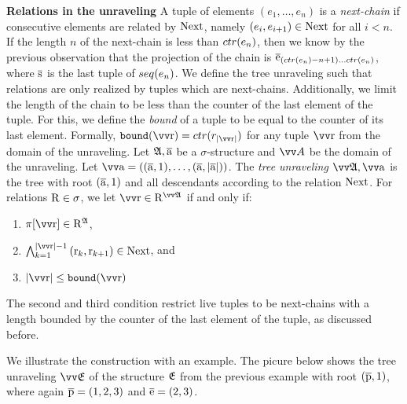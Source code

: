 \noindent
\textbf{Relations in the unraveling}
A tuple of elements $(e_{1}, \ldots, e_{n})$ is a \emph{next-chain} if consecutive elements are related by $\mathrm{Next}$, namely $(e_{i}, e_{i+1}) \in \mathrm{Next}$ for all $i < n$.
If the length $n$ of the next-chain is less than $\ctr{e_{n}}$, then we know by the previous observation that the projection of the chain is $\elemtuplee_{(\ctr{e_{n}}-n+1)\ldots{}\ctr{e_{n}}}$, where $\overline{\mathrm{s}}$ is the last tuple of $\seq{e_{n}}$.
We define the tree unraveling such that relations are only realized by tuples which are next-chains.
Additionally, we limit the length of the chain to be less than the counter of the last element of the tuple.
For this, we define the \emph{bound} of a tuple to be equal to the counter of its last element.
Formally, $\mathtt{bound}(\elemtuptupler) = \ctr{r_{|\elemtuptupler|}}$ for any tuple $\elemtuptupler$ from the domain of the unraveling.
Let ${\mathfrak{A}}, \overline{\mathrm{a}}$ be a $\sigma$-structure and $\unraveldom{A}$ be the domain of the unraveling.
Let $\elemtuptuplea = ((\elemtuplea, 1), \ldots, (\elemtuplea, |\elemtuplea|))$.
The \emph{tree unraveling} $\unravel{A}, \elemtuptuplea$ is the tree with root $(\overline{\mathrm{a}}, 1)$ and all descendants according to the relation $\mathrm{Next}$.
For relations $\mathrm{R} \in \sigma$, we let $\elemtuptupler \in \relR^{\unravel{A}}$ if and only if:\begin{enumerate}
  \item $\pi[\elemtuptupler] \in \relR^{\str{A}}$,
  \item $\bigwedge_{k=1}^{|\elemtuptupler|-1}{(\elemr_{k},\elemr_{k+1}) \in \relNext}$, and
  \item $|\elemtuptupler| \le \mathtt{bound}(\elemtuptupler)$
\end{enumerate}
The second and third condition restrict live tuples to be next-chains with a length bounded by the counter of the last element of the tuple, as discussed before.

We illustrate the construction with an example.
The picure below shows the tree unraveling $\unravel{E}$ of the structure ${\mathfrak{E}}$ from the previous example with root $(\overline{\mathrm{p}}, 1)$, where again $\overline{\mathrm{p}} = (1,2,3)$ and $\overline{\mathrm{e}} = (2,3)$.
\begin{figure}[H]
  \centering
  
\end{figure}

